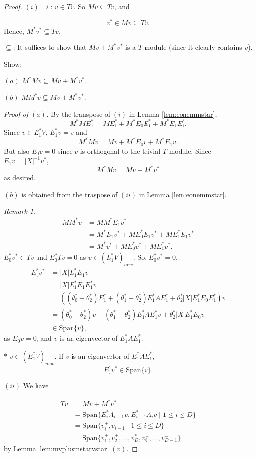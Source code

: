 \documentclass[
]{book}
\theoremstyle{definition}
\theoremstyle{definition}
\theoremstyle{definition}
\theoremstyle{definition}
\theoremstyle{remark}
\newtheorem*{remark}{Remark}
\begin{document}
\begin{proof}
\leavevmode

\((i)\) \(\supseteq\): \(v\in Tv\). So \(Mv \subseteq Tv\), and

\[v^* \in Mv \subseteq Tv.\]
Hence, \(M^*v^* \subseteq Tv\).

\(\subseteq\): It suffices to show that \(Mv + M^*v^*\) is a \(T\)-module (since it clearly contains \(v\)).

Show:

\((a)\) \(M^*Mv \subseteq Mv + M^*v^*\).

\((b)\) \(MM^*v \subseteq Mv + M^*v^*\).

\emph{Proof of \((a)\).}
By the transpose of \((i)\) in Lemma \ref{lem:eonemmstar},
\[M^*ME^*_1 = ME^*_1 + M^*E_0E^*_1 + M^*E_1E^*_1.\]
Since \(v\in E^*_1V\), \(E^*_1v = v\) and
\[M^*Mv = Mv + M^*E_0v + M^*E_1v.\]
But also \(E_0v = 0\) since \(v\) is orthogonal to the trivial \(T\)-module.
Since \(E_1v = |X|^{-1}v^*\),
\[M^*Mv = Mv + M^*v^*\]
as desired.

\((b)\) is obtained from the traspose of \((ii)\) in Lemma \ref{lem:eonemmstar}.

\begin{remark}
\begin{align}
MM^*v & = MM^*E_1v^*\\
& = M^*E_1v^* + ME^*_0E_1v^* + ME^*_1E_1v^*\\
& = M^*v^* + ME^*_0v^* + ME^*_1v^*.
\end{align}
\(E^*_0v^*\in Tv\) and \(E^*_0Tv = 0\) as \(v\in (E^*_1V)_{new}\). So, \(E^*_0v^* = 0\).
\begin{align}
E^*_1v^* & = |X|E^*_1E_1v \\
& = |X|E^*_1E_1E^*_1v\\
& = ((\theta^*_0-\theta^*_2)E^*_1 + (\theta^*_1-\theta^*_2)E^*_1AE^*_1 + \theta^*_2|X|E^*_1E_0E^*_1)v\\
& = (\theta^*_0-\theta^*_2)v + (\theta^*_1-\theta^*_2)E^*_1AE^*_1v + \theta^*_2|X|E^*_1E_0v\\
& \in \mathrm{Span}\{v\},
\end{align}
as \(E_0v = 0\), and \(v\) is an eigenvector of \(E^*_1AE^*_1\).

\(\ast\) \(v\in (E^*_1V)_{new}\). If \(v\) is an eigenvector of \(E^*_1AE^*_1\),
\[E^*_1v^* \in \mathrm{Span}\{v\}.\]
\end{remark}

\((ii)\) We have

\begin{align}
Tv & = Mv + M^*v^*\\
& = \mathrm{Span}\{E^*_iA_{i-1}v, E^*_{i-1}A_iv\mid 1\leq i\leq D\}\\
& = \mathrm{Span}\{v^+_i, v^-_{i-1}\mid 1\leq i\leq D\}\\
& = \mathrm{Span}\{v^+_1, v^+_2, \ldots, v^*_D, v_0^-, \ldots, v^-_{D-1}\}
\end{align}
by Lemma \ref{lem:mvplusmstarvstar} \((v)\).


\end{proof}
\end{document}
